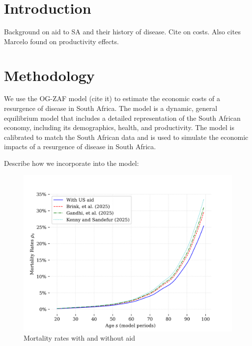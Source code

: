 \documentclass[letterpaper,12pt]{article}
\theoremstyle{definition}
\begin{document}
\begin{spacing}{1.5}


\newpage

\section{Introduction}\label{SecIntro}

Background on aid to SA and their history of disease.  Cite \cite{KS2025} on costs.  Also cites Marcelo found on productivity effects.

\section{Methodology}\label{SecMethod}

We use the OG-ZAF model (cite it) to estimate the economic costs of a resurgence of disease in South Africa.  The model is a dynamic, general equilibrium model that includes a detailed representation of the South African economy, including its demographics, health, and productivity.  The model is calibrated to match the South African data and is used to simulate the economic impacts of a resurgence of disease in South Africa.

Describe how we incorporate \cite{KS2025} into the model:

\begin{figure}[h]
    \caption{Mortality rates with and without aid}
    \centering
    \includegraphics[scale=0.75]{./tables_figures/mortality_rates.png}
\end{figure}


\end{spacing}
\end{document}
